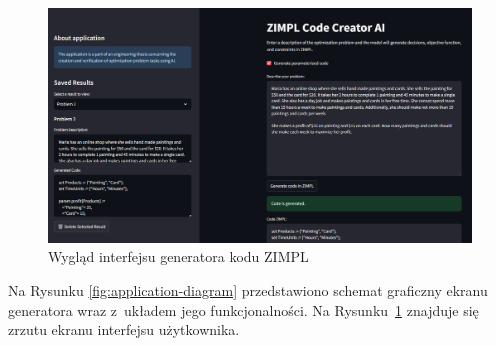 \begin{figure}[H]
    \centering
    \includegraphics[width=1\linewidth]{figures/app.png}
    \caption{Wygląd interfejsu generatora kodu ZIMPL}
    \label{fig:gui}
\end{figure}

Na Rysunku \ref{fig:application-diagram} przedstawiono schemat graficzny ekranu generatora wraz z~układem jego funkcjonalności. Na Rysunku~\ref{fig:gui} znajduje się zrzutu ekranu interfejsu użytkownika.


